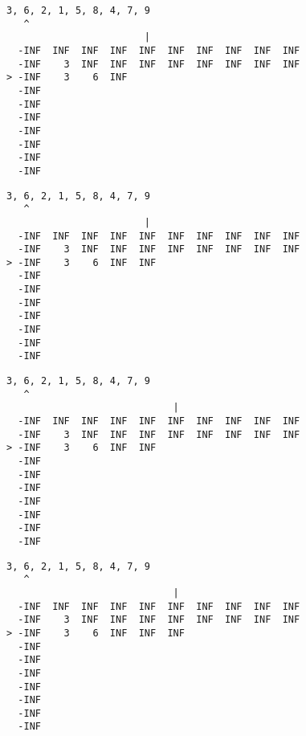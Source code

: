 { \begin{verbatim}
3, 6, 2, 1, 5, 8, 4, 7, 9
   ^
                        |
  -INF  INF  INF  INF  INF  INF  INF  INF  INF  INF
  -INF    3  INF  INF  INF  INF  INF  INF  INF  INF
> -INF    3    6  INF                              
  -INF                                             
  -INF                                             
  -INF                                             
  -INF                                             
  -INF                                             
  -INF                                             
  -INF                                             
\end{verbatim} }

{ \begin{verbatim}
3, 6, 2, 1, 5, 8, 4, 7, 9
   ^
                        |
  -INF  INF  INF  INF  INF  INF  INF  INF  INF  INF
  -INF    3  INF  INF  INF  INF  INF  INF  INF  INF
> -INF    3    6  INF  INF                         
  -INF                                             
  -INF                                             
  -INF                                             
  -INF                                             
  -INF                                             
  -INF                                             
  -INF                                             
\end{verbatim} }

{ \begin{verbatim}
3, 6, 2, 1, 5, 8, 4, 7, 9
   ^
                             |
  -INF  INF  INF  INF  INF  INF  INF  INF  INF  INF
  -INF    3  INF  INF  INF  INF  INF  INF  INF  INF
> -INF    3    6  INF  INF                         
  -INF                                             
  -INF                                             
  -INF                                             
  -INF                                             
  -INF                                             
  -INF                                             
  -INF                                             
\end{verbatim} }

{ \begin{verbatim}
3, 6, 2, 1, 5, 8, 4, 7, 9
   ^
                             |
  -INF  INF  INF  INF  INF  INF  INF  INF  INF  INF
  -INF    3  INF  INF  INF  INF  INF  INF  INF  INF
> -INF    3    6  INF  INF  INF                    
  -INF                                             
  -INF                                             
  -INF                                             
  -INF                                             
  -INF                                             
  -INF                                             
  -INF                                             
\end{verbatim} }

